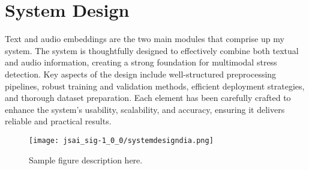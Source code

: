\documentclass[a4j, twocolumn]{article}
\begin{document}
\section{System Design}
Text and audio embeddings are the two main modules that comprise up my system. The system is thoughtfully designed to effectively combine both textual and audio information, creating a strong foundation for multimodal stress detection. Key aspects of the design include well-structured preprocessing pipelines, robust training and validation methods, efficient deployment strategies, and thorough dataset preparation. Each element has been carefully crafted to enhance the system's usability, scalability, and accuracy, ensuring it delivers reliable and practical results.
\begin{figure}[htbp]
    \centering
    \texttt{[image: jsai\_sig-1\_0\_0/systemdesigndia.png]}
    \caption{Sample figure description here.}
    \label{fig:systemdesigndia.png}
\end{figure}
\end{document}
